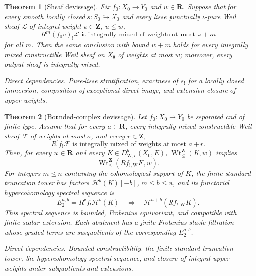 \documentclass[10pt]{article}
\newtheorem{theorem}{Theorem}[section]
\theoremstyle{definition}
\newcommand{\DW}{D^b_{\mathrm W,c}}
\newcommand{\IntWtLe}{\operatorname{Wt}^{\mathbf Z}_{\leq}}
\newcommand{\dep}[1]{\par\smallskip\noindent\textit{Direct dependencies.} #1\par}
\begin{document}
\begin{theorem}[Sheaf devissage]
Fix \(f_0:X_0\to Y_0\) and \(w\in\mathbf R\).  Suppose that for every smooth
locally closed \(s:S_0\hookrightarrow X_0\) and every lisse punctually \(\iota\)-pure
Weil sheaf \(\mathcal L\) of integral weight
\(u\in\mathbf Z\), \(u\le w\),
\[
                     R^m(f_0s)_!\mathcal L
       \text{ is integrally mixed of weights at most }u+m
\]
for all \(m\).  Then the same conclusion with bound \(w+m\) holds for every
integrally mixed constructible Weil sheaf on \(X_0\) of weights at most
\(w\); moreover, every output sheaf is integrally mixed.
\dep{Pure-lisse stratification, exactness of \(s_!\) for a locally closed
immersion, composition of exceptional direct image, and extension closure
of upper weights.}
\end{theorem}

\begin{theorem}[Bounded-complex devissage]
Let \(f_0:X_0\to Y_0\) be separated and of finite type.  Assume that for
every \(a\in\mathbf R\), every integrally mixed constructible Weil sheaf
\(\mathcal F\) of weights at most \(a\), and every \(r\in\mathbf Z\),
\[
 R^rf_!\mathcal F\text{ is integrally mixed of weights at most }a+r.
\]
Then, for every \(w\in\mathbf R\) and every \(K\in\DW(X_0,E)\),
\(\IntWtLe(K,w)\) implies
\[
                         \IntWtLe(Rf_{!,\mathrm W}K,w).
\]
For integers \(m\leq n\) containing the cohomological support of \(K\), the
finite standard truncation tower has factors
\(\mathcal H^b(K)[-b]\), \(m\leq b\leq n\), and its functorial
hypercohomology spectral sequence is
\[
 E_2^{a,b}=R^af_!\mathcal H^b(K)
 \quad\Longrightarrow\quad
 \mathcal H^{a+b}(Rf_{!,\mathrm W}K).
\]
This spectral sequence is bounded, Frobenius equivariant, and compatible
with finite scalar extension.  Each abutment has a finite Frobenius-stable
filtration whose graded terms are subquotients of the corresponding
\(E_2^{a,b}\).
\dep{Bounded constructibility, the finite standard truncation tower, the
hypercohomology spectral sequence, and closure of integral upper weights
under subquotients and extensions.}
\end{theorem}
\end{document}
